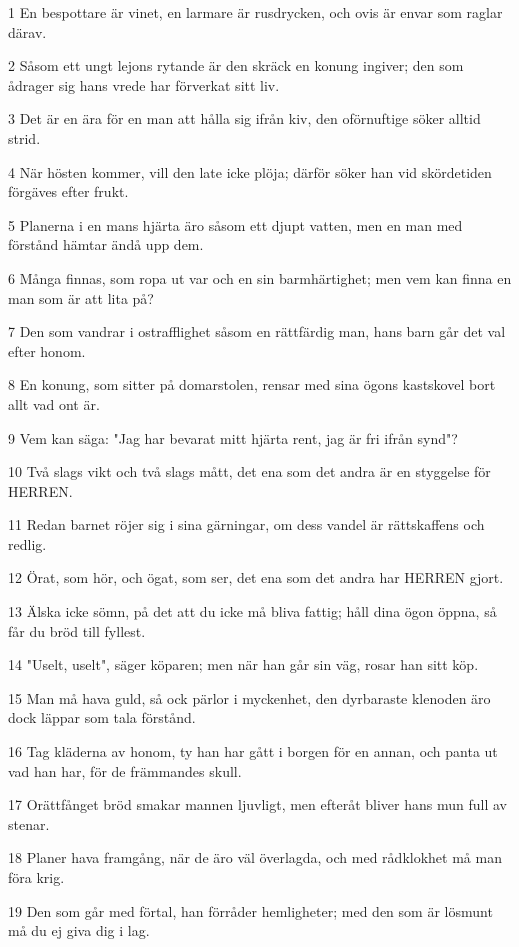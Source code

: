 \par 1 En bespottare är vinet, en larmare är rusdrycken, och ovis är envar som raglar därav.
\par 2 Såsom ett ungt lejons rytande är den skräck en konung ingiver; den som ådrager sig hans vrede har förverkat sitt liv.
\par 3 Det är en ära för en man att hålla sig ifrån kiv, den oförnuftige söker alltid strid.
\par 4 När hösten kommer, vill den late icke plöja; därför söker han vid skördetiden förgäves efter frukt.
\par 5 Planerna i en mans hjärta äro såsom ett djupt vatten, men en man med förstånd hämtar ändå upp dem.
\par 6 Många finnas, som ropa ut var och en sin barmhärtighet; men vem kan finna en man som är att lita på?
\par 7 Den som vandrar i ostrafflighet såsom en rättfärdig man, hans barn går det val efter honom.
\par 8 En konung, som sitter på domarstolen, rensar med sina ögons kastskovel bort allt vad ont är.
\par 9 Vem kan säga: "Jag har bevarat mitt hjärta rent, jag är fri ifrån synd"?
\par 10 Två slags vikt och två slags mått, det ena som det andra är en styggelse för HERREN.
\par 11 Redan barnet röjer sig i sina gärningar, om dess vandel är rättskaffens och redlig.
\par 12 Örat, som hör, och ögat, som ser, det ena som det andra har HERREN gjort.
\par 13 Älska icke sömn, på det att du icke må bliva fattig; håll dina ögon öppna, så får du bröd till fyllest.
\par 14 "Uselt, uselt", säger köparen; men när han går sin väg, rosar han sitt köp.
\par 15 Man må hava guld, så ock pärlor i myckenhet, den dyrbaraste klenoden äro dock läppar som tala förstånd.
\par 16 Tag kläderna av honom, ty han har gått i borgen för en annan, och panta ut vad han har, för de främmandes skull.
\par 17 Orättfånget bröd smakar mannen ljuvligt, men efteråt bliver hans mun full av stenar.
\par 18 Planer hava framgång, när de äro väl överlagda, och med rådklokhet må man föra krig.
\par 19 Den som går med förtal, han förråder hemligheter; med den som är lösmunt må du ej giva dig i lag.
